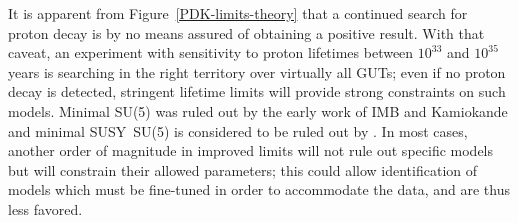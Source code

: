 It is apparent from Figure~\ref{PDK-limits-theory} that a continued
search for proton decay is by no means assured of obtaining a positive
result.  With that caveat, an experiment with sensitivity to proton lifetimes
between $10^{33}$ and $10^{35}$ years is searching in the right territory over
virtually all GUTs; even if no proton decay is detected,
stringent lifetime limits will provide strong constraints on such
models.  Minimal SU(5) was ruled out by the early work of IMB and
Kamiokande and minimal SUSY~SU(5) is considered to be ruled out by \superk.
In most cases, another order of magnitude in improved limits will not rule out
specific models but will constrain their allowed parameters;
this could allow identification of models which must be fine-tuned
in order to accommodate the data, and are thus less favored.


%


